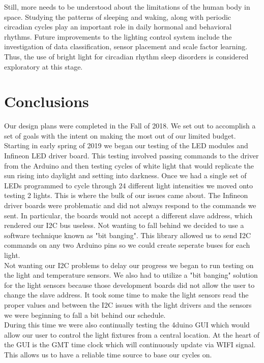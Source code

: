 \documentclass[12pt,a4paper]{report}
\begin{document}
Still, more needs to be understood about the limitations of the human body in space. Studying the patterns of sleeping and waking, along with periodic circadian cycles play an important role in daily hormonal and behavioral rhythms. Future improvements to the lighting control system include the investigation of data classification, sensor placement and scale factor learning. Thus, the use of bright light for circadian rhythm sleep disorders is considered exploratory at this stage. 

\section{Conclusions}
Our design plans were completed in the Fall of 2018. We set out to accomplish a set of goals with the intent on making the most out of our limited budget. Starting in early spring of 2019 we began our testing of the LED modules and Infineon LED driver board. This testing involved passing commands to the driver from the Arduino and then testing cycles of white light that would replicate the sun rising into daylight and setting into darkness. Once we had a single set of LEDs programmed to cycle through 24 different light intensities we moved onto testing 2 lights. This is where the bulk of our issues came about. The Infineon driver boards were problematic and did not always respond to the commands we sent. In particular, the boards would not accept a different slave address, which rendered our I2C bus useless. Not wanting to fall behind we decided to use a software technique known as "bit banging". This library allowed us to send I2C commands on any two Arduino pins so we could create seperate buses for each light.\\ 
Not wanting our I2C problems to delay our progress we began to run testing on the light and temperature sensors. We also had to utilize a "bit banging" solution for the light sensors because those development boards did not allow the user to change the slave address. It took some time to make the light sensors read the proper values and between the I2C issues with the light drivers and the sensors we were beginning to fall a bit behind our schedule.\\ 
During this time we were also continually testing the 4duino GUI which would allow our user to control the light fixtures from a central location. At the heart of the GUI is the GMT time clock which will continuously update via WIFI signal. This allows us to have a reliable time source to base our cycles on.\\
\end{document}
